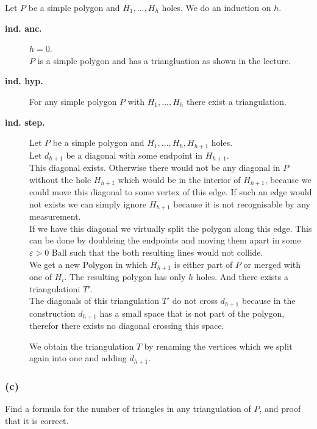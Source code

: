 \documentclass[11pt,a4paper,ngerman]{article}
\begin{document}
Let $P$ be a simple polygon and $H_1, ... , H_h$ holes. We do an induction on $h$.
\begin{description}
    \item[\bfseries ind. anc.] $h=0$.\\
        $P$ is a simple polygon and has a triangluation as shown in the lecture.
    \item[\bfseries ind. hyp.] For any simple polygon $P$ with $H_1, ... , H_h$ there exist a triangulation.
    \item[\bfseries ind. step.] Let $P$ be a simple polygon and $H_1, ... , H_h, H_{h+1}$ holes.\\
        Let $d_{h+1}$ be a diagonal with some endpoint in $H_{h+1}$.\\
        
        This diagonal exists. Otherwise there would not be any diagonal in $P$ without the hole $H_{h+1}$
        which would be in the interior of $H_{h+1}$, because we could move this diagonal to some vertex
        of this edge. If such an edge would not exists we can simply ignore $H_{h+1}$ because it is not
        recognisable by any measurement.\\

        If we have this diagonal we virtually split the polygon along this edge. This can be done by doubleing the
        endpoints and moving them apart in some $\varepsilon > 0$ Ball such that the both resulting lines would not collide.\\

        We get a new Polygon in which $H_{h+1}$ is either part of $P$ or merged with one of $H_i$.
        The resulting polygon has only $h$ holes. And there exists a triangulationi $T'$.\\

        The diagonals of this triangulation $T'$ do not cross $d_{h+1}$ because in the construction $d_{h+1}$ has a small space
        that is not part of the polygon, therefor there exists no diagonal crossing this space.

        We obtain the triangulation $T$ by renaming the vertices which we split again into one and adding $d_{h+1}$.
\end{description}

\subsubsection*{(c)}

Find a formula for the number of triangles in any triangulation of $P$, and proof that it is correct.\\
\end{document}

